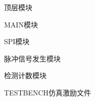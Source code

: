 \noindent
顶层模块

\noindent
MAIN模块

\noindent
SPI模块

\noindent
脉冲信号发生模块

\noindent
检测计数模块

TESTBENCH仿真激励文件

